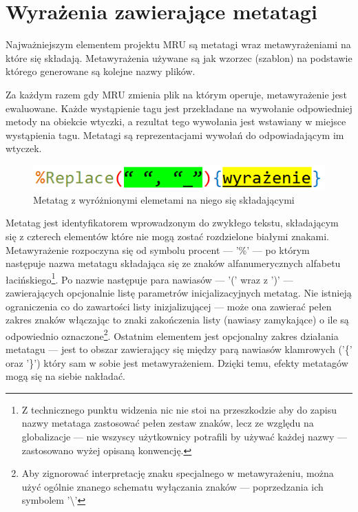 \section{Wyrażenia zawierające metatagi}
Najważniejszym elementem projektu MRU są metatagi wraz metawyrażeniami na które się składają.
Metawyrażenia używane są jak wzorzec (szablon) na podstawie którego generowane są kolejne nazwy plików.

\par
Za każdym razem gdy MRU zmienia plik na którym operuje, metawyrażenie jest ewaluowane. Każde wystąpienie tagu jest przekładane na wywołanie odpowiedniej metody na obiekcie wtyczki, a rezultat tego wywołania jest wstawiany w miejsce wystąpienia tagu.
Metatagi są reprezentacjami wywołań do odpowiadającym im wtyczek.

\begin{figure}
\begin{center}
\includegraphics[scale=0.50]{img/metatag_sample.png}
\end{center}
\caption{Metatag z wyróżnionymi elemetami na niego się składającymi}
\end{figure}

\par
Metatag jest identyfikatorem wprowadzonym do zwykłego tekstu, składającym się z czterech elementów które nie mogą zostać rozdzielone białymi znakami. Metawyrażenie rozpoczyna się od symbolu procent --- '\%' --- po którym następuje nazwa metatagu składająca się ze znaków alfanumerycznych alfabetu łacińskiego\footnote{Z technicznego punktu widzenia nic nie stoi na przeszkodzie aby do zapisu nazwy metataga zastosować pełen zestaw znaków, lecz ze względu na globalizacje --- nie wszyscy użytkownicy potrafili by używać każdej nazwy --- zastosowano wyżej opisaną konwencję.}.
Po nazwie następuje para nawiasów --- '(' wraz z ')' --- zawierających opcjonalnie listę parametrów inicjalizacyjnych metatag. Nie istnieją ograniczenia co do zawartości listy inizjalizującej --- może ona zawierać pełen zakres znaków włączając to znaki zakończenia listy (nawiasy zamykające) o ile są odpowiednio oznaczone\footnote{Aby zignorować interpretację znaku specjalnego w metawyrażeniu, można użyć ogólnie znanego schematu wyłączania znaków --- poprzedzania ich symbolem '\textbackslash'}.
Ostatnim elementem jest opcjonalny zakres działania metatagu --- jest to obszar zawierający się między parą nawiasów klamrowych ('\{' oraz '\}') który sam w sobie jest metawyrażeniem. Dzięki temu, efekty metatagów mogą się na siebie nakładać.

